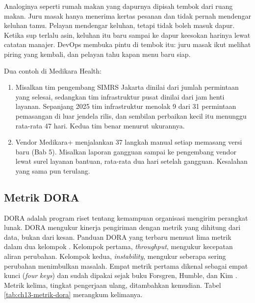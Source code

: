 Analoginya seperti rumah makan yang dapurnya dipisah tembok dari ruang makan. Juru masak hanya
menerima kertas pesanan dan tidak pernah mendengar keluhan tamu. Pelayan mendengar keluhan, tetapi
tidak boleh masuk dapur. Ketika sup terlalu asin, keluhan itu baru sampai ke dapur keesokan harinya
lewat catatan manajer. DevOps membuka pintu di tembok itu: juru masak ikut melihat piring yang
kembali, dan pelayan tahu kapan menu baru siap.

Dua contoh di Medikara Health:
\begin{enumerate}
  \item Misalkan tim pengembang SIMRS Jakarta dinilai dari jumlah permintaan yang selesai,
        sedangkan tim infrastruktur pusat dinilai dari jam henti layanan. Sepanjang 2025 tim
        infrastruktur menolak 9 dari 31 permintaan pemasangan di luar jendela rilis, dan sembilan
        perbaikan kecil itu menunggu rata-rata 47 hari. Kedua tim benar menurut ukurannya.
  \item Vendor Medikara+ menjalankan 37 langkah manual setiap memasang versi baru (Bab 5).
        Misalkan laporan gangguan sampai ke pengembang vendor lewat surel layanan bantuan,
        rata-rata dua hari setelah gangguan. Kesalahan yang sama pun terulang.
\end{enumerate}

\subsection{Metrik DORA}

DORA adalah program riset tentang kemampuan organisasi mengirim perangkat lunak. DORA mengukur kinerja pengiriman dengan metrik yang dihitung dari data, bukan dari kesan.
Panduan DORA yang terbaru memuat lima metrik dalam dua kelompok \cite{dora-metrics}. Kelompok
pertama, \textit{throughput}, mengukur kecepatan aliran perubahan. Kelompok kedua,
\textit{instability}, mengukur seberapa sering perubahan menimbulkan masalah. Empat metrik pertama
dikenal sebagai empat kunci (\textit{four keys}) dan sudah dipakai sejak buku Forsgren, Humble, dan
Kim \cite{c13-forsgren2018}. Metrik kelima, tingkat pengerjaan ulang, ditambahkan kemudian. Tabel
\ref{tab:ch13-metrik-dora} merangkum kelimanya.

